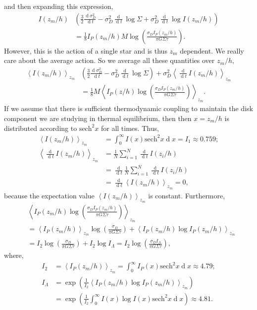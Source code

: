 \documentclass[usenatbib]{mnras}
\renewcommand{\d}[1]{\! \mathrm{d}#1 \:}
\newcommand{\deriv}[2]{\frac{\d{#1}}{\d{#2}}}
\newcommand{\sech}{\mathrm{sech}}
\newcommand{\EV}[1]{\left< #1 \right>}
\renewcommand{\d}[1]{\ensuremath{\operatorname{d}\!{#1}}}
\begin{document}
and then expanding this expression,
\begin{align}
I(z_m / h) & \left( \frac{3}{2} \deriv{\sigma_D^2}{t} - \sigma_D^2 \deriv{}{t} \log{\Sigma} + \sigma_D^2 \deriv{}{t} \log{I(z_m / h)} \right) 
\\
& = \frac{1}{8}  I_P(z_m / h) M \log{\left( \frac{\sigma_D I_P(z_m / h)}{\pi G \Sigma \tau} \right)}. \nonumber
\end{align}
However, this is the action of a single star and is thus $z_m$ dependent. We really care about the average action. So we average all these quantities over $z_m / h$,
\begin{align}
\EV{I(z_m / h)}_{z_m} & \left( \frac{3}{2} \deriv{\sigma_D^2}{t} - \sigma_D^2 \deriv{}{t} \log{\Sigma} \right) + \sigma_D^2 \EV{\deriv{}{t} I(z_m / h) }_{z_m}  
\\
&= \frac{1}{8} M \EV{ I_P(z / h) \log{\left( \frac{\sigma_D I_P(z_m / h)}{\pi G \Sigma \tau} \right)} }_{z_m}. \nonumber
\end{align}
If we assume that there is sufficient thermodynamic coupling to maintain the disk component we are studying in thermal equilibrium, then then $x = z_m / h$ is distributed according to $\sech^2{x}$ for all times. Thus,
\begin{align}
\EV{I(z_m / h)}_{z_m} & = \int_0^\infty I(x) \sech^2{x} \d{x} = I_1 \approx 0.759;
\\
\EV{\deriv{}{t} I(z_m / h) }_{z_m} & = \frac{1}{N} \sum_{i = 1}^N \deriv{}{t} I(z_i / h)
\\
& = \deriv{}{t} \frac{1}{N} \sum_{i = 1}^N \deriv{}{t} I(z_i / h) \nonumber
\\
& = \deriv{}{t} \EV{I(z_m / h)}_{z_m} = 0, \nonumber
\end{align}
because the expectation value $\EV{I(z_m / h)}_{z_m}$ is constant. Furthermore,
\begin{align}
& \EV{ I_P(z_m / h)  \log{\left( \frac{\sigma_D I_P(z_m / h)}{\pi G \Sigma \tau} \right)} }_{z_m}
\\
& = \EV{I_P(z_m / h)}_{z_m} \log{\left( \frac{\sigma_D}{\pi G \Sigma \tau} \right)}  + \EV{I_P(z_m/h) \log{I_P(z_m / h)}}_{z_m} \nonumber
\\
& = I_2 \log{\left( \frac{\sigma_D}{\pi G \Sigma \tau} \right)} + I_2 \log{I_{\Lambda}} = I_2 \log{\left( \frac{\sigma_D I_{\Lambda}}{\pi G \Sigma \tau} \right)}, \nonumber
\end{align}
where,
\begin{align}
I_2 & = \EV{I_P(z_m / h)}_{z_m} = \int_0^\infty I_P(x) \sech^2{x} \d{x} \approx 4.79;
\\
I_{\Lambda} & = \exp{\left( \frac{1}{I_2} \EV{I_P(z_m / h) \log{I_P(z_m / h)} }_{z_m} \right)} \nonumber
\\
& = \exp{\left( \frac{1}{I_2} \int_0^\infty I(x) \log{I(x)} \sech^2{x} \d{x} \right)} \approx 4.81.
\end{align}
\end{document}

